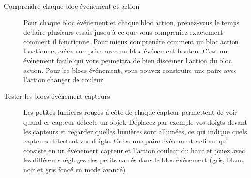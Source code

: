 \label{a.tips}


\begin{description}

\item[Comprendre chaque bloc événement et action]
Pour chaque bloc événement et chaque bloc action,
prenez-vous le temps de faire plusieurs essais jusqu'à ce que vous compreniez
exactement comment il fonctionne.
Pour mieux comprendre comment un bloc action fonctionne,
créez une paire avec un bloc événement bouton.
C'est un événement facile qui vous permettra de bien discerner l'action du bloc action.
Pour les blocs événement, vous pouvez construire une paire avec l'action changer de couleur.

\item[Tester les blocs événement capteurs]
Les petites lumières rouges à côté de chaque capteur permettent de voir quand ce capteur détecte
un objet.
Déplacez par exemple vos doigts devant les capteurs et regardez quelles lumières sont allumées,
ce qui indique quels capteurs détectent vos doigts.
Créez une paire événement-actions qui consiste en un événement capteur et l'action couleur du haut
et jouez avec les différents réglages des petits carrés dans le bloc événement (gris, blanc, noir et
gris foncé en mode avancé).

\end{description}


